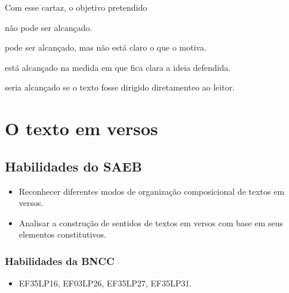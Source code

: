 
Com esse cartaz, o objetivo pretendido

\begin{escolha}[itemsep=-5pt]
\item não pode ser alcançado.

\item pode ser alcançado, mas não está claro o que o motiva.

\item está alcançado na medida em que fica clara a ideia defendida.

\item seria alcançado se o texto fosse dirigido diretamenteo ao leitor.
\end{escolha}

\chapter{O texto em versos}


\section*{Habilidades do SAEB}

\begin{itemize}
  \item Reconhecer diferentes modos de organização composicional de
  textos em versos.
  \item Analisar a construção de sentidos de textos em versos com base
  em seus elementos constitutivos.
\end{itemize}

\subsection{Habilidades da BNCC}

\begin{itemize}
\item EF35LP16, EF03LP26, EF35LP27, EF35LP31.
\end{itemize}

